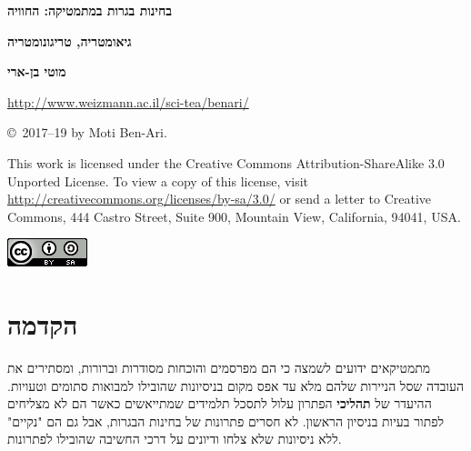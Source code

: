 
\thispagestyle{empty}

\begin{center}
\textbf{\LARGE בחינות בגרות במתמטיקה: החוויה}

\bigskip
\bigskip

\textbf{\LARGE גיאומטריה, טריגונומטריה}

\bigskip
\bigskip
\bigskip
\bigskip

\textbf{\Large מוטי בן-ארי}

\bigskip
\bigskip

\url{http://www.weizmann.ac.il/sci-tea/benari/}
\end{center}



\vfill


\begin{footnotesize}
\begin{center}
\copyright{}\ 2017--19 by Moti Ben-Ari.
\end{center}

This work is licensed under the Creative Commons Attribution-ShareAlike 3.0 Unported License. To view a copy of this license, visit \url{http://creativecommons.org/licenses/by-sa/3.0/} or send a letter to Creative Commons, 444 Castro Street, Suite 900, Mountain View, California, 94041, USA.
\end{footnotesize}

\bigskip

\begin{center}
\includegraphics[width=.15\textwidth]{../../by-sa.png}
\end{center}

\np
\thispagestyle{empty}
\mbox{}
\np
\thispagestyle{empty}

\tableofcontents
\np
\thispagestyle{empty}
\mbox{}
\np

\section*{הקדמה}

מתמטיקאים ידועים לשמצה כי הם מפרסמים והוכחות מסודרות וברורות, ומסתירים את העובדה שסל הניירות שלהם מלא עד אפס מקום בניסיונות שהובילו למבואות סתומים וטעויות. ההיעדר של 
\textbf{תהליכי}
הפתרון עלול לתסכל תלמידים שמתייאשים כאשר הם לא מצליחים לפתור בעיות בניסיון הראשון. לא חסרים פתרונות של בחינות הבגרות, אבל גם הם "נקיים" ללא ניסיונות שלא צלחו ודיונים על דרכי החשיבה שהובילו לפתרונות.

